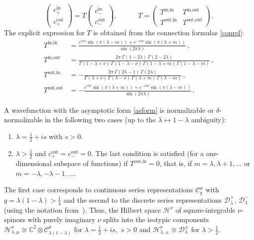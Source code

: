 \documentclass[12pt]{article}
\newcommand{\calC}{\mathcal{C}}
\newcommand{\calD}{\mathcal{D}}
\newcommand{\calH}{\mathcal{H}}
\newcommand{\CC}{\mathbb{C}}
\newcommand{\IN}{\text{in}}
\newcommand{\OUT}{\text{out}}
\begin{document}
\begin{equation}
\begin{pmatrix} c_{+}^{\IN}\\ c_{+}^{\OUT} \end{pmatrix}
=T\begin{pmatrix} c_{-}^{\IN}\\ c_{-}^{\OUT} \end{pmatrix},\qquad\quad
T=\begin{pmatrix}
T^{\IN,\IN} & T^{\IN,\OUT}\\ T^{\OUT,\IN} & T^{\OUT,\OUT}
\end{pmatrix}.
\end{equation}
The explicit expression for $T$ is obtained from the connection formulas \eqref{conrel}:
\begin{equation}
\begin{aligned}
T^{\IN,\IN} &=
\frac{e^{i\pi\nu}\sin(\pi(\lambda-m))+e^{-i\pi\nu}\sin(\pi(\lambda+m))}
{\sin(2\pi\lambda)}\,,\\[4pt]
T^{\IN,\OUT} &=
\frac{2\pi\,\Gamma(1-2\lambda)\,\Gamma(2-2\lambda)}
{\Gamma(1-\lambda+\nu)\,\Gamma(1-\lambda-\nu)\,
\Gamma(1-\lambda+m)\,\Gamma(1-\lambda-m)}\,,\\[4pt]
T^{\OUT,\IN} &=
-\frac{2\pi\,\Gamma(2\lambda-1)\,\Gamma(2\lambda)}
{\Gamma(\lambda+\nu)\,\Gamma(\lambda-\nu)\,
\Gamma(\lambda+m)\,\Gamma(\lambda-m)}\,,\\[4pt]
T^{\OUT,\OUT} &=
-\frac{e^{i\pi\nu}\sin(\pi(\lambda+m))+e^{-i\pi\nu}\sin(\pi(\lambda-m))}
{\sin(2\pi\lambda)}\,.
\end{aligned}
\end{equation}

A wavefunction with the asymptotic form \eqref{asform} is normalizable or $\delta$-normalizable in the following two cases (up to the $\lambda\leftrightarrow 1-\lambda$ ambiguity):
\begin{enumerate}
\item $\lambda=\frac{1}{2}+is$ with $s>0$.
\item $\lambda>\frac{1}{2}$ and $c_{+}^{\OUT}=c_{-}^{\OUT}=0$. The last condition is satisfied (for a one-dimensional subspace of functions) if $T^{\OUT,\IN}=0$, that is, if $m=\lambda,\lambda+1,\ldots$ or $m=-\lambda,-\lambda-1,\ldots$.
\end{enumerate}
The first case corresponds to continuous series representations $\calC_{q}^{\mu}$ with $q=\lambda(1-\lambda)>\frac{1}{4}$ and the second to the discrete series representations $\calD_{\lambda}^{+}$, $\calD_{\lambda}^{-}$ (using the notation from~\cite{SL2R}). Thus, the Hilbert space $\calH^\nu$ of square-integrable $\nu$-spinors with purely imaginary $\nu$ splits into the isotypic components $\calH^{\nu}_{\lambda,\mu}\cong \CC^{2}\otimes\calC_{\lambda(1-\lambda)}^{\mu}$ for $\lambda=\frac{1}{2}+is$,\, $s>0$ and $\calH^{\nu}_{\lambda,\pm}\cong \calD_{\lambda}^{\pm}$ for $\lambda>\frac{1}{2}$.
\end{document}
